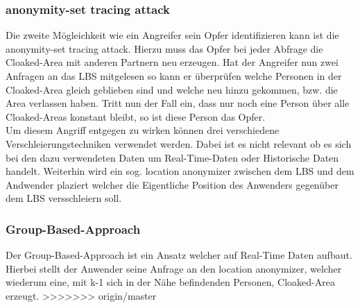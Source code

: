 \subsubsection{anonymity-set tracing attack}
Die zweite Mögleichkeit wie ein Angreifer sein Opfer identifizieren kann ist die anonymity-set tracing attack. Hierzu muss das Opfer bei jeder Abfrage die Cloaked-Area mit anderen Partnern neu erzeugen. Hat der Angreifer nun zwei Anfragen an das LBS mitgelesen so kann er überprüfen welche Personen in der Cloaked-Area gleich geblieben sind und welche neu hinzu gekommen, bzw. die Area verlassen haben. Tritt nun der Fall ein, dass nur noch eine Person über alle Cloaked-Areas konstant bleibt, so ist diese Person das Opfer.\\
Um diesem Angriff entgegen zu wirken können drei verschiedene Verschleierungstechniken verwendet werden. Dabei ist es nicht relevant ob es sich bei den dazu verwendeten Daten um Real-Time-Daten oder Historische Daten handelt. Weiterhin wird ein sog. location anonymizer zwischen dem LBS und dem Andwender plaziert welcher die Eigentliche Position des Anwenders gegenüber dem LBS versschleiern soll.
\subsubsection{Group-Based-Approach}
Der Group-Based-Approach ist ein Ansatz welcher auf Real-Time Daten aufbaut. Hierbei stellt der Anwender seine Anfrage an den location anonymizer, welcher wiederum eine, mit k-1 sich in der Nähe befindenden Personen, Cloaked-Area erzeugt.  
>>>>>>> origin/master
